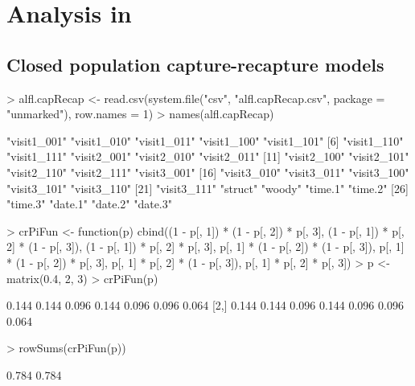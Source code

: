 \documentclass[a4paper]{article}
\renewenvironment{Schunk}{\vspace{\topsep}}{\vspace{\topsep}}
\begin{document}
\section{Analysis in }




\subsection{Closed population capture-recapture models}


\begin{Schunk}
\begin{Sinput}
> alfl.capRecap <- read.csv(system.file("csv", "alfl.capRecap.csv", 
     package = "unmarked"), row.names = 1)
> names(alfl.capRecap)
\end{Sinput}
\begin{Soutput}
 [1] "visit1_001" "visit1_010" "visit1_011" "visit1_100" "visit1_101"
 [6] "visit1_110" "visit1_111" "visit2_001" "visit2_010" "visit2_011"
[11] "visit2_100" "visit2_101" "visit2_110" "visit2_111" "visit3_001"
[16] "visit3_010" "visit3_011" "visit3_100" "visit3_101" "visit3_110"
[21] "visit3_111" "struct"     "woody"      "time.1"     "time.2"    
[26] "time.3"     "date.1"     "date.2"     "date.3"    
\end{Soutput}
\end{Schunk}



\begin{Schunk}
\begin{Sinput}
> crPiFun <- function(p) {
     cbind((1 - p[, 1]) * (1 - p[, 2]) * p[, 3], (1 - 
         p[, 1]) * p[, 2] * (1 - p[, 3]), (1 - p[, 1]) * 
         p[, 2] * p[, 3], p[, 1] * (1 - p[, 2]) * (1 - 
         p[, 3]), p[, 1] * (1 - p[, 2]) * p[, 3], p[, 
         1] * p[, 2] * (1 - p[, 3]), p[, 1] * p[, 2] * 
         p[, 3])
 }
> p <- matrix(0.4, 2, 3)
> crPiFun(p)
\end{Sinput}
\begin{Soutput}
      [,1]  [,2]  [,3]  [,4]  [,5]  [,6]  [,7]
[1,] 0.144 0.144 0.096 0.144 0.096 0.096 0.064
[2,] 0.144 0.144 0.096 0.144 0.096 0.096 0.064
\end{Soutput}
\begin{Sinput}
> rowSums(crPiFun(p))
\end{Sinput}
\begin{Soutput}
[1] 0.784 0.784
\end{Soutput}
\end{Schunk}
\end{document}
